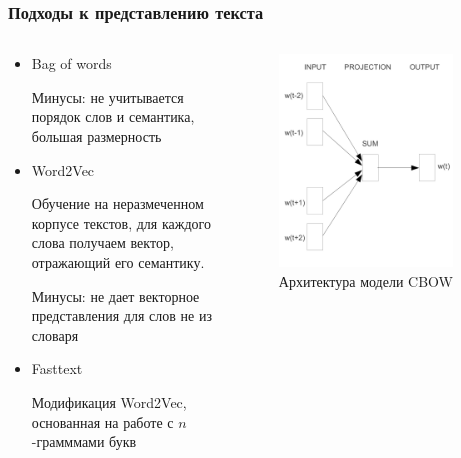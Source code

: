 \documentclass[10pt]{beamer}
\begin{document}
\begin{frame}
\frametitle{Подходы к представлению текста}

\begin{columns}
    \begin{column}{0.5\textwidth}
		\begin{itemize}
			\item
			Bag of words

			Минусы: не учитывается порядок слов и семантика, большая размерность

			\item
			Word2Vec
	
			Обучение на неразмеченном корпусе текстов, для каждого слова получаем вектор, отражающий его семантику.

			Минусы: не дает векторное представления для слов не из словаря

			\item
			Fasttext

			Модификация Word2Vec, основанная на работе с $n$-грамммами букв
		\end{itemize}
	\end{column}
    \begin{column}{0.5\textwidth}
        \begin{center}
        	\begin{figure}
	            \includegraphics[width=0.9\textwidth]{images/cbow.png} 
    	        \caption{Архитектура модели CBOW}
        	\end{figure}
        \end{center}
    \end{column}
\end{columns}

\end{frame}
\end{document}
